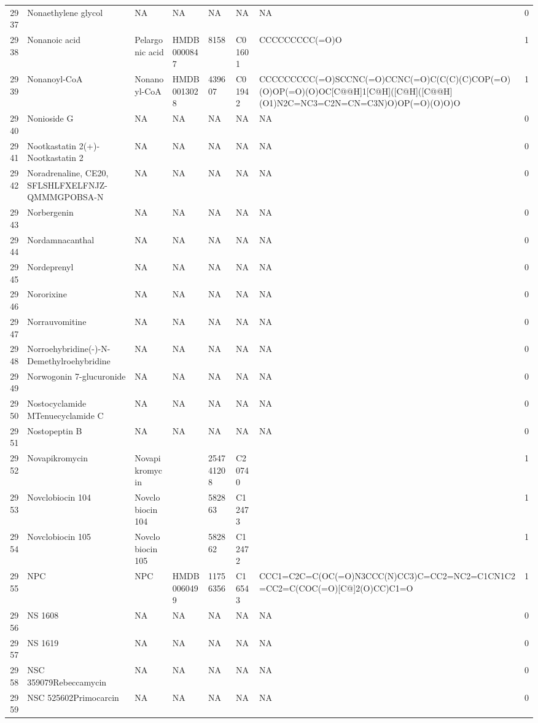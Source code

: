 \documentclass[a4paper]{article}
\begin{document}
\begin{longtable}{rlllllll}
  2937 & Nonaethylene glycol & NA & NA & NA & NA & NA & 0 \\ 
  2938 & Nonanoic acid & Pelargonic acid & HMDB0000847 & 8158 & C01601 & CCCCCCCCC(=O)O & 1 \\ 
  2939 & Nonanoyl-CoA & Nonanoyl-CoA & HMDB0013028 & 439607 & C01942 & CCCCCCCCC(=O)SCCNC(=O)CCNC(=O)C(C(C)(C)COP(=O)(O)OP(=O)(O)OC[C@@H]1[C@H]([C@H]([C@@H](O1)N2C=NC3=C2N=CN=C3N)O)OP(=O)(O)O)O & 1 \\ 
  2940 & Nonioside G & NA & NA & NA & NA & NA & 0 \\ 
  2941 & Nootkastatin 2(+)-Nootkastatin 2 & NA & NA & NA & NA & NA & 0 \\ 
  2942 & Noradrenaline, CE20, SFLSHLFXELFNJZ-QMMMGPOBSA-N & NA & NA & NA & NA & NA & 0 \\ 
  2943 & Norbergenin & NA & NA & NA & NA & NA & 0 \\ 
  2944 & Nordamnacanthal & NA & NA & NA & NA & NA & 0 \\ 
  2945 & Nordeprenyl & NA & NA & NA & NA & NA & 0 \\ 
  2946 & Nororixine & NA & NA & NA & NA & NA & 0 \\ 
  2947 & Norrauvomitine & NA & NA & NA & NA & NA & 0 \\ 
  2948 & Norroehybridine(-)-N-Demethylroehybridine & NA & NA & NA & NA & NA & 0 \\ 
  2949 & Norwogonin 7-glucuronide & NA & NA & NA & NA & NA & 0 \\ 
  2950 & Nostocyclamide MTenuecyclamide C & NA & NA & NA & NA & NA & 0 \\ 
  2951 & Nostopeptin B & NA & NA & NA & NA & NA & 0 \\ 
  2952 & Novapikromycin & Novapikromycin &  & 254741208 & C20740 &  & 1 \\ 
  2953 & Novclobiocin 104 & Novclobiocin 104 &  & 582863 & C12473 &  & 1 \\ 
  2954 & Novclobiocin 105 & Novclobiocin 105 &  & 582862 & C12472 &  & 1 \\ 
  2955 & NPC & NPC & HMDB0060499 & 11756356 & C16543 & CCC1=C2C=C(OC(=O)N3CCC(N)CC3)C=CC2=NC2=C1CN1C2=CC2=C(COC(=O)[C@]2(O)CC)C1=O & 1 \\ 
  2956 & NS 1608 & NA & NA & NA & NA & NA & 0 \\ 
  2957 & NS 1619 & NA & NA & NA & NA & NA & 0 \\ 
  2958 & NSC 359079Rebeccamycin & NA & NA & NA & NA & NA & 0 \\ 
  2959 & NSC 525602Primocarcin & NA & NA & NA & NA & NA & 0 \\ 

\end{longtable}
\end{document}
